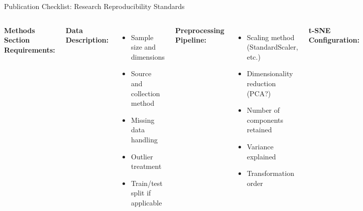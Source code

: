 \documentclass[aspectratio=169]{beamer}
\begin{document}
\begin{frame}{Publication Checklist: Research Reproducibility Standards}
\begin{columns}
\textbf{Methods Section Requirements:}

\textbf{Data Description:}
\begin{itemize}
\item Sample size and dimensions
\item Source and collection method
\item Missing data handling
\item Outlier treatment
\item Train/test split if applicable
\end{itemize}

\textbf{Preprocessing Pipeline:}
\begin{itemize}
\item Scaling method (StandardScaler, etc.)
\item Dimensionality reduction (PCA?)
\item Number of components retained
\item Variance explained
\item Transformation order
\end{itemize}

\textbf{t-SNE Configuration:}
\begin{itemize}
\item Software library and version
\item All hyperparameters (perplexity, $\eta$, iterations, early exaggeration)
\item Number of runs
\item Random seed(s)
\item Convergence criteria
\end{itemize}

\textbf{Validation Reporting:}

\begin{itemize}
\item NPr(k) metric with k value
\item Trustworthiness score
\item Stability across runs (correlation)
\item Perplexity sensitivity analysis
\item Statistical tests performed
\item P-values and effect sizes
\end{itemize}


\end{columns}
\end{frame}
\end{document}
